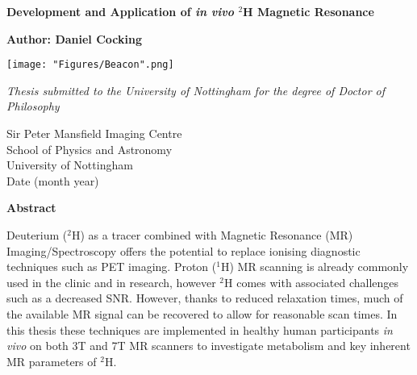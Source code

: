 \documentclass[12pt,english]{report}
\begin{document}
 

\setlength{\headheight}{25pt}

\begin{titlepage}
   \begin{center}
 
       \textbf{\huge{Development and Application of \textit{in vivo} $^2$H Magnetic Resonance}}
 
       \vspace{1cm}
 
       \huge{\textbf{Author: Daniel Cocking} \\}
       
       \vspace{1.5cm}
       \texttt{[image: "Figures/Beacon".png]}
       \vspace{1cm}
       
       \Large{\emph{Thesis submitted to the University of Nottingham for the degree of Doctor of Philosophy}} 
 
 \vspace{2cm}
 
       Sir Peter Mansfield Imaging Centre \\
       School of Physics and Astronomy\\
       University of Nottingham\\
       Date (month year)
 
   \end{center}
\end{titlepage}
\thispagestyle{empty}
\vspace*{\fill}

\newpage
\thispagestyle{plain}
\setcounter{page}{1}
\begin{center}
    \textbf{Abstract}
\end{center}
Deuterium ($^2$H) as a tracer combined with Magnetic Resonance (MR) Imaging/Spectroscopy offers the potential to replace ionising diagnostic techniques such as \ac{PET} imaging. Proton ($^1$H) MR scanning is already commonly used in the clinic and in research, however $^2$H comes with associated challenges such as a decreased \ac{SNR}. However, thanks to reduced relaxation times, much of the available MR signal can be recovered to allow for reasonable scan times. In this thesis these techniques are implemented in healthy human participants \textit{in vivo} on both 3T and 7T MR scanners to investigate metabolism and key inherent MR parameters of $^2$H.
\end{document}
